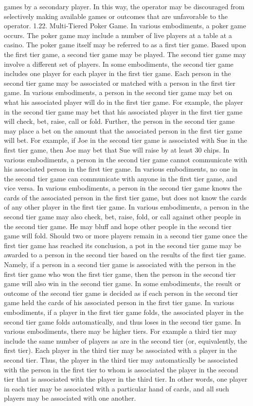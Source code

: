 \documentclass[11pt,a4paper]{article}
\begin{document}
games by a secondary player. In this way, the operator may be discouraged from selectively making available games or outcomes that are unfavorable to the operator. 1.22. Multi-Tiered Poker Game. In various embodiments, a poker game occurs. The poker game may include a number of live players at a table at a casino. The poker game itself may be referred to as a first tier game. Based upon the first tier game, a second tier game may be played. The second tier game may involve a different set of players. In some embodiments, the second tier game includes one player for each player in the first tier game. Each person in the second tier game may be associated or matched with a person in the first tier game. In various embodiments, a person in the second tier game may bet on what his associated player will do in the first tier game. For example, the player in the second tier game may bet that his associated player in the first tier game will check, bet, raise, call or fold. Further, the person in the second tier game may place a bet on the amount that the associated person in the first tier game will bet. For example, if Joe in the second tier game is associated with Sue in the first tier game, then Joe may bet that Sue will raise by at least 30 chips. In various embodiments, a person in the second tier game cannot communicate with his associated person in the first tier game. In various embodiments, no one in the second tier game can communicate with anyone in the first tier game, and vice versa. In various embodiments, a person in the second tier game knows the cards of the associated person in the first tier game, but does not know the cards of any other player in the first tier game. In various embodiments, a person in the second tier game may also check, bet, raise, fold, or call against other people in the second tier game. He may bluff and hope other people in the second tier game will fold. Should two or more players remain in a second tier game once the first tier game has reached its conclusion, a pot in the second tier game may be awarded to a person in the second tier based on the results of the first tier game. Namely, if a person in a second tier game is associated with the person in the first tier game who won the first tier game, then the person in the second tier game will also win in the second tier game. In some embodiments, the result or outcome of the second tier game is decided as if each person in the second tier game held the cards of his associated person in the first tier game. In various embodiments, if a player in the first tier game folds, the associated player in the second tier game folds automatically, and thus loses in the second tier game. In various embodiments, there may be higher tiers. For example a third tier may include the same number of players as are in the second tier (or, equivalently, the first tier). Each player in the third tier may be associated with a player in the second tier. Thus, the player in the third tier may automatically be associated with the person in the first tier to whom is associated the player in the second tier that is associated with the player in the third tier. In other words, one player in each tier may be associated with a particular hand of cards, and all such players may be associated with one another. 
\end{document}
